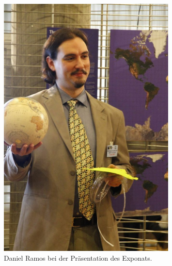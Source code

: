 \documentclass[a4paper,12pt]{article}
\begin{document}
 \begin{figure}[ht]
\begin{center}
\includegraphics[width=0.8\textwidth]{../common/karten_der_erde.jpg}
\caption{Daniel Ramos bei der Präsentation des Exponats.} 
\end{center}
\end{figure}
 
\end{document}
